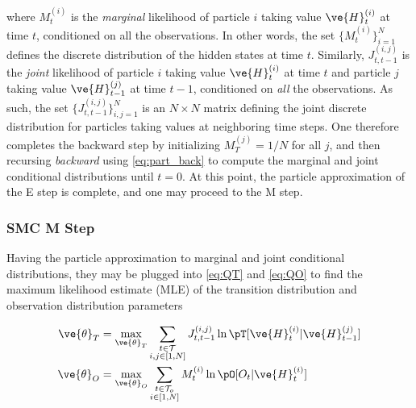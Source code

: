 \noindent where $M_t^{(i)}$ is the \emph{marginal} likelihood of particle $i$ taking value $\ve{H}_t^{(i)}$ at time $t$, conditioned on all the observations.  In other words, the set $\{M_t^{(i)}\}_{i=1}^N$ defines the discrete distribution of the hidden states at time $t$. Similarly, $J^{(i,j)}_{t,t-1}$ is the \emph{joint} likelihood of particle $i$ taking value $\ve{H}_t^{(i)}$ at time $t$ and particle $j$ taking value $\ve{H}_{t-1}^{(j)}$ at time $t-1$, conditioned on \emph{all} the observations. As such, the set $\{J^{(i,j)}_{t,t-1}\}_{i,j=1}^N$ is an $N\times N$ matrix defining the joint discrete distribution for particles taking values at neighboring time steps.  One therefore completes the backward step by initializing $M_T^{(j)}=1/N$ for all $j$, and then recursing \emph{backward} using \eqref{eq:part_back} to compute the marginal and joint conditional distributions until $t=0$.  At this point, the particle approximation of the E step is complete, and one may proceed to the M step. %
%
%

\subsubsection{SMC M Step}

Having the particle approximation to marginal and joint conditional distributions, they may be plugged into \eqref{eq:QT} and \eqref{eq:QO} to find the maximum likelihood estimate (MLE) of the transition distribution and observation distribution parameters

\begin{align} \label{eq:smcQT}
\ve{\theta}_T &= \max_{\ve{\theta}_T} \sum_{\substack{t \in\mathcal{T} \\ i,j \in[1, N]}} J^{(i,j)}_{t,t-1}  \ln \pT
[\ve{H}_t^{(i)} |  \ve{H}_{t-1}^{(j)}] \\ \label{eq:smcQO}
\ve{\theta}_O &= \max_{\ve{\theta}_O}  \sum_{\substack{t \in\mathcal{T}_o \\ i\in[1,N]}} M^{(i)}_t \ln \pO [O_t | \ve{H}_t^{(i)}]
\end{align}

